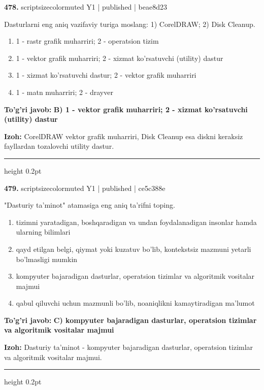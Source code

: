 \documentclass[10pt,a4paper]{article}
\begin{document}
{\bfseries\sffamily\color{ink} 478.} {scriptsizecolor{muted} Y1 | published | beae8d23}
\par
Dasturlarni eng aniq vazifaviy turiga moslang: 1) CorelDRAW; 2) Disk Cleanup.
\begin{enumerate}[label=\Alph*),leftmargin=9mm]
\item 1 - rastr grafik muharriri; 2 - operatsion tizim
\item 1 - vektor grafik muharriri; 2 - xizmat ko'rsatuvchi (utility) dastur
\item 1 - xizmat ko'rsatuvchi dastur; 2 - vektor grafik muharriri
\item 1 - matn muharriri; 2 - drayver
\end{enumerate}
\begin{tcolorbox}[enhanced,breakable,colback=teal!4,colframe=teal!60!black,boxrule=0.45pt,arc=1.2mm,left=2.7mm,right=2.7mm,top=1.8mm,bottom=1.8mm,before skip=2mm,after skip=2mm]
{\bfseries\sffamily\color{teal}To'g'ri javob:} \textbf{B) 1 - vektor grafik muharriri; 2 - xizmat ko'rsatuvchi (utility) dastur}
\par\smallskip
{\bfseries Izoh:} CorelDRAW vektor grafik muharriri, Disk Cleanup esa diskni keraksiz fayllardan tozalovchi utility dastur.
\end{tcolorbox}
\vspace{2mm}\hrule height 0.2pt\vspace{3mm}

{\bfseries\sffamily\color{ink} 479.} {scriptsizecolor{muted} Y1 | published | ce5c388e}
\par
"Dasturiy ta'minot" atamasiga eng aniq ta'rifni toping.
\begin{enumerate}[label=\Alph*),leftmargin=9mm]
\item tizimni yaratadigan, boshqaradigan va undan foydalanadigan insonlar hamda ularning bilimlari
\item qayd etilgan belgi, qiymat yoki kuzatuv bo'lib, kontekstsiz mazmuni yetarli bo'lmasligi mumkin
\item kompyuter bajaradigan dasturlar, operatsion tizimlar va algoritmik vositalar majmui
\item qabul qiluvchi uchun mazmunli bo'lib, noaniqlikni kamaytiradigan ma'lumot
\end{enumerate}
\begin{tcolorbox}[enhanced,breakable,colback=teal!4,colframe=teal!60!black,boxrule=0.45pt,arc=1.2mm,left=2.7mm,right=2.7mm,top=1.8mm,bottom=1.8mm,before skip=2mm,after skip=2mm]
{\bfseries\sffamily\color{teal}To'g'ri javob:} \textbf{C) kompyuter bajaradigan dasturlar, operatsion tizimlar va algoritmik vositalar majmui}
\par\smallskip
{\bfseries Izoh:} Dasturiy ta'minot - kompyuter bajaradigan dasturlar, operatsion tizimlar va algoritmik vositalar majmui.
\end{tcolorbox}
\vspace{2mm}\hrule height 0.2pt\vspace{3mm}
\end{document}
